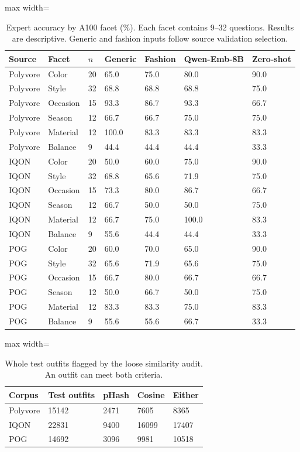\begin{table}[htbp]\centering\small
\caption{Expert accuracy by A100 facet (\%). Each facet contains 9--32 questions. Results are descriptive. Generic and fashion inputs follow source validation selection.}\label{tab:facets}
\begin{adjustbox}{max width=\linewidth}\begin{tabular}{lllllll}\toprule
Source & Facet & $n$ & Generic & Fashion & Qwen-Emb-8B & Zero-shot\\\midrule
Polyvore & Color & 20 & 65.0 & 75.0 & 80.0 & 90.0\\
Polyvore & Style & 32 & 68.8 & 68.8 & 68.8 & 75.0\\
Polyvore & Occasion & 15 & 93.3 & 86.7 & 93.3 & 66.7\\
Polyvore & Season & 12 & 66.7 & 66.7 & 75.0 & 75.0\\
Polyvore & Material & 12 & 100.0 & 83.3 & 83.3 & 83.3\\
Polyvore & Balance & 9 & 44.4 & 44.4 & 44.4 & 33.3\\
IQON & Color & 20 & 50.0 & 60.0 & 75.0 & 90.0\\
IQON & Style & 32 & 68.8 & 65.6 & 71.9 & 75.0\\
IQON & Occasion & 15 & 73.3 & 80.0 & 86.7 & 66.7\\
IQON & Season & 12 & 66.7 & 50.0 & 50.0 & 75.0\\
IQON & Material & 12 & 66.7 & 75.0 & 100.0 & 83.3\\
IQON & Balance & 9 & 55.6 & 44.4 & 44.4 & 33.3\\
POG & Color & 20 & 60.0 & 70.0 & 65.0 & 90.0\\
POG & Style & 32 & 65.6 & 71.9 & 65.6 & 75.0\\
POG & Occasion & 15 & 66.7 & 80.0 & 66.7 & 66.7\\
POG & Season & 12 & 50.0 & 66.7 & 50.0 & 75.0\\
POG & Material & 12 & 83.3 & 83.3 & 75.0 & 83.3\\
POG & Balance & 9 & 55.6 & 55.6 & 66.7 & 33.3\\
\bottomrule\end{tabular}\end{adjustbox}\end{table}
\begin{table}[htbp]\centering\small
\caption{Whole test outfits flagged by the loose similarity audit. An outfit can meet both criteria.}\label{tab:near}
\begin{adjustbox}{max width=\linewidth}\begin{tabular}{lllll}\toprule
Corpus & Test outfits & pHash & Cosine & Either\\\midrule
Polyvore & 15142 & 2471 & 7605 & 8365\\
IQON & 22831 & 9400 & 16099 & 17407\\
POG & 14692 & 3096 & 9981 & 10518\\
\bottomrule\end{tabular}\end{adjustbox}\end{table}
